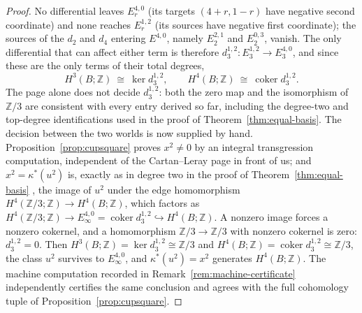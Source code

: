 \documentclass[11pt,a4paper]{article}
\begin{document}
\begin{proof}
No differential leaves $E_r^{4,0}$ (its targets $(4+r,1-r)$ have negative
second coordinate) and none reaches $E_r^{1,2}$ (its sources have negative
first coordinate); the sources of the $d_2$ and $d_4$ entering $E^{4,0}$,
namely $E_2^{2,1}$ and $E_2^{0,3}$, vanish. The only differential that can
affect either term is therefore $d_3^{1,2}\colon E_3^{1,2}\to E_3^{4,0}$, and
since these are the only terms of their total degrees,
\[
H^3(B;\mathbb Z)\ \cong\ \ker d_3^{1,2},
\qquad
H^4(B;\mathbb Z)\ \cong\ \operatorname{coker} d_3^{1,2}.
\]
The page alone does not decide $d_3^{1,2}$: both the zero map and the
isomorphism of $\mathbb Z/3$ are consistent with every entry derived so far,
including the degree-two and top-degree identifications used in the proof of
Theorem~\ref{thm:equal-basis}. The decision between the two worlds is now
supplied by hand. Proposition~\ref{prop:cupsquare} proves $x^2\ne0$ by an
integral transgression computation, independent of the Cartan--Leray page in
front of us; and $x^2=\kappa^*(u^2)$ is, exactly as in degree two in the
proof of Theorem~\ref{thm:equal-basis} \cite{Brown1982}, the image of $u^2$
under the edge homomorphism $H^4(\mathbb Z/3;\mathbb Z)\to H^4(B;\mathbb Z)$,
which factors as $H^4(\mathbb Z/3;\mathbb Z)\to E_\infty^{4,0}=
\operatorname{coker}d_3^{1,2}\hookrightarrow H^4(B;\mathbb Z)$. A nonzero
image forces a nonzero cokernel, and a homomorphism
$\mathbb Z/3\to\mathbb Z/3$ with nonzero cokernel is zero: $d_3^{1,2}=0$.
Then $H^3(B;\mathbb Z)=\ker d_3^{1,2}\cong\mathbb Z/3$ and
$H^4(B;\mathbb Z)=\operatorname{coker}d_3^{1,2}\cong\mathbb Z/3$, the class
$u^2$ survives to $E_\infty^{4,0}$, and $\kappa^*(u^2)=x^2$ generates
$H^4(B;\mathbb Z)$. The machine computation recorded in
Remark~\ref{rem:machine-certificate} independently certifies the same
conclusion and agrees with the full cohomology tuple of
Proposition~\ref{prop:cupsquare}.
\end{proof}
\end{document}
